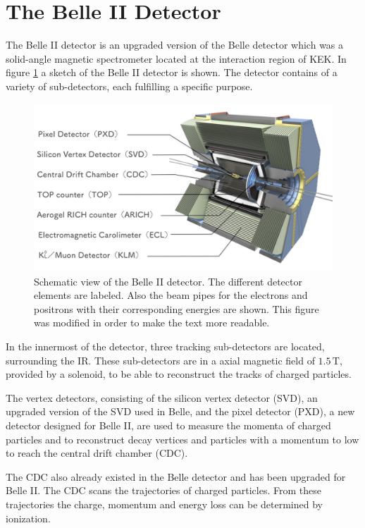 \documentclass[a4paper,11pt,twosided,final,german,openbib,pdftex,listof=totoc,bibliography=totoc]{scrbook}
\begin{document}
\section{The Belle II Detector}
\label{sec:BelleII}

The Belle II detector is an upgraded version of the Belle detector which was a solid-angle magnetic spectrometer located at the interaction region of KEK. In figure  \ref{fig:Belle2} a sketch of the Belle II detector is shown. The detector contains of a variety of sub-detectors, each fulfilling a specific purpose.
 
\begin{figure}[h!]
	\centering
	\includegraphics[width=\textwidth]{Bilder/Belle2.pdf}
	
	\caption[Belle II Detector]{Schematic view of the Belle II detector. The different detector elements are labeled. Also the beam pipes for the electrons and positrons with their corresponding energies are shown. \cite{BDetector} This figure was modified in order to make the text more readable.}
	\label{fig:Belle2}
\end{figure}

 In the innermost of the detector, three tracking sub-detectors are located, surrounding the IR. These sub-detectors are in a axial magnetic field of $1.5\,\textrm{T}$, provided by a solenoid, to be able to reconstruct the tracks of charged particles. 
 
 The vertex detectors, consisting of the silicon vertex detector (SVD), an upgraded version of the SVD used in Belle, and the pixel detector (PXD), a new detector designed for Belle II, are used to measure the momenta of charged particles and to reconstruct decay vertices and particles with a momentum to low to reach the central drift chamber (CDC).

The CDC also already existed in the Belle detector and has been upgraded for Belle II. The CDC scans the trajectories of charged particles. From these trajectories the charge, momentum and energy loss can be determined by ionization. 
\end{document}

